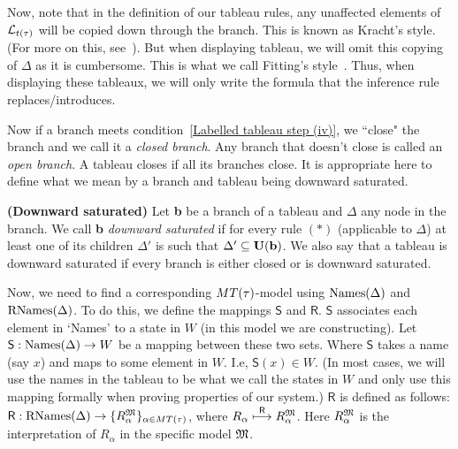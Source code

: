 \par Now, note that in the definition of our tableau rules, any unaffected elements of $\mathcal{L}_{t(\tau)}$ will be copied down through the branch. This is known as Kracht's style. (For more on this, see~\cite{kracht1999tools}). But when displaying tableau, we will omit this copying of $\Delta$ as it is cumbersome. This is what we call Fitting's style~\cite{fitting1972tableau}. Thus, when displaying these tableaux, we will only write the formula that the inference rule replaces/introduces.

\par Now if a branch meets condition~\ref{Labelled tableau step (iv)}, we ``close" the branch and we call it a \textit{closed branch}. Any branch that doesn't close is called an \textit{open branch}. A tableau closes if all its branches close. It is appropriate here to define what we mean by a branch and tableau being downward saturated.


\begin{definition}\label{downward saturated def}
    \textbf{(Downward saturated)} Let \textbf{b} be a branch of a tableau and $\Delta$ any node in the branch. We call \textbf{b} \textit{downward saturated} if for every rule $(*)$ (applicable to $\Delta$) at least one of its children $\Delta'$ is such that $\Delta'\subseteq\textbf{U}(\textbf{b})$.
    We also say that a tableau is downward saturated if every branch is either closed or is downward saturated.
\end{definition}

\par Now, we need to find a corresponding $MT(\tau)$-model using $\text{Names}(\Delta)$ and $\text{RNames($\Delta$)}$. To do this, we define the mappings $\mathsf{S}$ and $\mathsf{R}$. $\mathsf{S}$ associates each element in `Names' to a state in $W$ (in this model we are constructing). Let $\mathsf{S}: \text{Names}(\Delta)\rightarrow W$ be a mapping between these two sets. Where $\mathsf{S}$ takes a name (say $x$) and maps to some element in $W$. I.e, $\mathsf{S}(x)\in W$. (In most cases, we will use the names in the tableau to be what we call the states in $W$ and only use this mapping formally when proving properties of our system.) $\mathsf{R}$ is defined as follows: $\mathsf{R}: \text{RNames($\Delta$)}\rightarrow\{ R^{\mathfrak{M}}_{\alpha} \}_{\alpha \in MT(\tau)}$, where $R_\alpha \stackrel{\textsf{R}}{\longmapsto} R_\alpha^{\mathfrak{M}}$. Here $R_\alpha^{\mathfrak{M}}$ is the interpretation of $R_\alpha$ in the specific model $\mathfrak{M}$.

